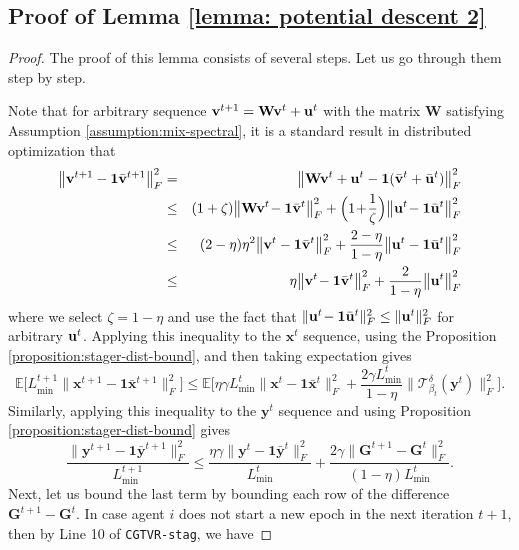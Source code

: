 \documentclass{article}
\newcommand{\ctdb}{\mathcal{T}^\delta_{\beta_t}}
\newcommand{\bGt}{\mathbf{G}^t}
\newcommand{\bGte}{\mathbf{G}^{t+1}}
\newcommand{\bxt}{\mathbf{x}^t}
\newcommand{\bvt}{\mathbf{v}^t}
\newcommand{\bvte}{\mathbf{v}^{t+1}}
\newcommand{\bxte}{\mathbf{x}^{t+1}}
\newcommand{\byt}{\mathbf{y}^t}
\newcommand{\byte}{\mathbf{y}^{t+1}}
\newcommand{\bbxt}{\bar{\mathbf{x}}^t}
\newcommand{\bbxte}{\bar{\mathbf{x}}^{t+1}}
\newcommand{\bbyt}{\bar{\mathbf{y}}^t}
\newcommand{\bbyte}{\bar{\mathbf{y}}^{t+1}}
\newcommand{\bbvte}{\bar{\mathbf{v}}^{t+1}}
\newcommand{\bbvt}{\bar{\mathbf{v}}^{t}}
\newcommand{\EE}{\mathbb{E}}
\newcommand{\bW}{\mathbf{W}}
\newcommand{\bone}{\mathbf{1}}
\begin{document}
\subsection{Proof of Lemma \ref{lemma: potential descent 2}}
\label{appdx:lemma:potential}
\begin{proof}
The proof of this lemma consists of several steps. Let us go through them step by step. \vspace{0.2cm}

  Note that for arbitrary sequence $\bvte = \bW\bvt + {\bf u}^t$ with the matrix $\bW$ satisfying Assumption \ref{assumption:mix-spectral}, it is a standard result in distributed optimization that 
\begin{eqnarray}
\label{eqn:mixing}
\big\|\bvte-\bone\bbvte\big\|_F^2 &=& \big\|\bW\bvt+{\bf u}^t - \bone(\bbvt+\bar{{\bf u}}^t)\big\|_F^2\\
& \leq & (1+\zeta)\big\|\bW\bvt\! - \bone \bbvt\big\|_F^2 + \Big(1\!+\!\frac{1}{\zeta}\Big)\big\|{\bf u}^t \!- \bone\bar{{\bf u}}^t\big\|_F^2\nonumber\\
& \leq & (2-\eta)\eta^2\big\|\bvt - \bone \bbvt\big\|_F^2 + \frac{2-\eta}{1-\eta}\big\|{\bf u}^t - \bone\bar{{\bf u}}^t\big\|_F^2\nonumber\\
& \leq & \eta\big\|\bvt\! - \bone \bbvt\big\|_F^2 + \frac{2}{1-\eta}\big\|{\bf u}^t \big\|_F^2\nonumber 
\end{eqnarray} 
where we select $\zeta = 1-\eta$ and use the fact that $\|{\bf u}^t\! - \bone\bar{{\bf u}}^t\|_F^2\leq \|{\bf u}^t\|_F^2$ for arbitrary ${\bf u}^t$. Applying this inequality to the $\bxt$ sequence, using the Proposition \ref{proposition:stager-dist-bound}, and then taking expectation gives 
\begin{equation}
\label{lm:potential-1}
\EE\big[L_{\min}^{t+1}\|\bxte-\bone\bbxte\|^2_F\big]\leq \EE\Big[\eta\gamma L_{\min}^t\big\|\bxt\! - \bone \bbxt\big\|_F^2 + \frac{2\gamma L_{\min}^t}{1-\eta}\big\|\ctdb(\byt) \big\|_F^2\Big].
\end{equation}
Similarly, applying this inequality to the $\byt$ sequence and using Proposition \ref{proposition:stager-dist-bound} gives 
\begin{equation}
\label{lm:potential-2}
\frac{\|\byte-\bone\bbyte\|^2_F}{L_{\min}^{t+1}} \leq \frac{\eta\gamma\|\byt-\bone\bbyt\|_F^2}{L_{\min}^{t}} + \frac{2\gamma\|\bGte- \bGt\|_F^2}{(1-\eta)L_{\min}^t}.
\end{equation}
Next, let us bound the last term by bounding each row of the difference $\bGte- \bGt$. In case agent $i$ does not start a new epoch in the next iteration $t+1$, then by Line 10 of \texttt{CGTVR-stag}, we have

\end{proof}
\end{document}
